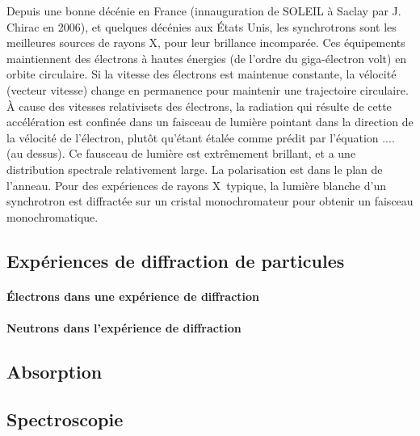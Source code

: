 Depuis une bonne décénie en France (innauguration de SOLEIL à Saclay par J. Chirac en 2006), et quelques décénies aux États Unis, les synchrotrons sont les meilleures sources de rayons X, pour leur brillance incomparée. Ces équipements maintiennent des électrons à hautes énergies (de l'ordre du giga-électron volt) en orbite circulaire. Si la vitesse des électrons est maintenue constante, la vélocité (vecteur vitesse) change en permanence pour maintenir une trajectoire circulaire. À cause des vitesses relativisets des électrons, la radiation qui résulte de cette accélération est confinée dans un faisceau de lumière pointant dans la direction de la vélocité de l'électron, plutôt qu'étant étalée comme prédit par l'équation .... (au dessus). Ce fausceau de lumière est extrêmement brillant, et a une distribution spectrale relativement large. La polarisation est dans le plan de l'anneau. Pour des expériences de rayons X typique, la lumière blanche d'un synchrotron est diffractée sur un cristal monochromateur pour obtenir un faisceau monochromatique.

\subsection{Expériences de diffraction de particules}

\paragraph{Électrons dans une expérience de diffraction}

\paragraph{Neutrons dans l'expérience de diffraction}

\subsection{Absorption}

\subsection{Spectroscopie}
